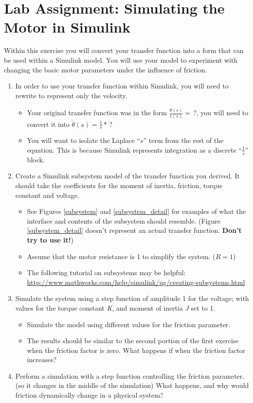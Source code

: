 \documentclass[openany,11pt,fleqn]{book} %
\begin{document}
\section{Lab Assignment: Simulating the Motor in Simulink}
Within this exercise you will convert your transfer function into a form that can be used within a Simulink model. You will use your model to experiment with changing the basic motor parameters under the influence of friction.

\begin{enumerate}
    \item In order to use your transfer function within Simulink, you will need to rewrite to represent only the velocity. 
    \begin{itemize}
        \item Your original transfer function was in the form $\frac{\dot{\theta}(s)}{v(s)} = \,?$, you will need to convert it into $\dot{\theta}(s) = \frac{1}{s}*\,?$
        \item You will want to isolate the Laplace ``$s$'' term from the rest of the equation. This is because Simulink represents integration as a discrete ``$\frac{1}{s}$'' block. 
    \end{itemize}
    \item Create a Simulink subsystem model of the transfer function you derived. It should take the coefficients for the moment of inertia, friction, torque constant and voltage.
    \begin{itemize}
        \item See Figures \ref{subsystem} and \ref{subsystem_detail} for examples of what the interface and contents of the subsystem should resemble. (Figure \ref{subsystem_detail} doesn't represent an actual transfer function. \textbf{Don't try to use it!})
        \item Assume that the motor resistance is 1 to simplify the system. ($R=1$)
        \item The following tutorial on subsystems may be helpful:\\ \href{http://www.mathworks.com/help/simulink/ug/creating-subsystems.html}{http://www.mathworks.com/help/simulink/ug/creating-subsystems.html}
     \end{itemize}
    \item Simulate the system using a step function of amplitude 1 for the voltage; with values for the torque constant \textit{K}, and moment of inertia \textit{J} set to 1. 
    \begin{itemize}
        \item Simulate the model using different values for the friction parameter.
        \item The results should be similar to the second portion of the first exercise when the friction factor is zero. What happens if when the friction factor increases?
    \end{itemize}
    \item Perform a simulation with a step function controlling the friction parameter. (so it changes in the middle of the simulation) What happens, and why would friction dynamically change in a physical system? 
\end{enumerate}
\end{document}
